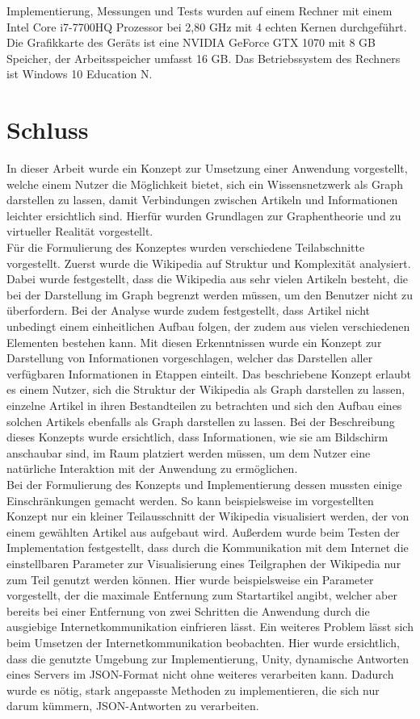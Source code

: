 \documentclass[12pt, a4paper]{article}
\begin{document}
Implementierung, Messungen und Tests wurden auf einem Rechner mit einem Intel Core i7-7700HQ Prozessor bei 2,80 GHz mit 4 echten Kernen durchgeführt. Die Grafikkarte des Geräts ist eine NVIDIA GeForce GTX 1070 mit 8 GB Speicher, der Arbeitsspeicher umfasst 16 GB. Das Betriebssystem des Rechners ist Windows 10 Education N.

\newpage
\section{Schluss}
In dieser Arbeit wurde ein Konzept zur Umsetzung einer Anwendung vorgestellt, welche einem Nutzer die Möglichkeit bietet, sich ein Wissensnetzwerk als Graph darstellen zu lassen, damit Verbindungen zwischen Artikeln und Informationen leichter ersichtlich sind. Hierfür wurden Grundlagen zur Graphentheorie und zu virtueller Realität vorgestellt.\\

Für die Formulierung des Konzeptes wurden verschiedene Teilabschnitte vorgestellt. Zuerst wurde die Wikipedia auf Struktur und Komplexität analysiert. Dabei wurde festgestellt, dass die Wikipedia aus sehr vielen Artikeln besteht, die bei der Darstellung im Graph begrenzt werden müssen, um den Benutzer nicht zu überfordern. Bei der Analyse wurde zudem festgestellt, dass Artikel nicht unbedingt einem einheitlichen Aufbau folgen, der zudem aus vielen verschiedenen Elementen bestehen kann. Mit diesen Erkenntnissen wurde ein Konzept zur Darstellung von Informationen vorgeschlagen, welcher das Darstellen aller verfügbaren Informationen in Etappen einteilt. Das beschriebene Konzept erlaubt es einem Nutzer, sich die Struktur der Wikipedia als Graph darstellen zu lassen, einzelne Artikel in ihren Bestandteilen zu betrachten und sich den Aufbau eines solchen Artikels ebenfalls als Graph darstellen zu lassen. Bei der Beschreibung dieses Konzepts wurde ersichtlich, dass Informationen, wie sie am Bildschirm anschaubar sind, im Raum platziert werden müssen, um dem Nutzer eine natürliche Interaktion mit der Anwendung zu ermöglichen.\\

Bei der Formulierung des Konzepts und Implementierung dessen mussten einige Einschränkungen gemacht werden. So kann beispielsweise im vorgestellten Konzept nur ein kleiner Teilausschnitt der Wikipedia visualisiert werden, der von einem gewählten Artikel aus aufgebaut wird. Außerdem wurde beim Testen der Implementation festgestellt, dass durch die Kommunikation mit dem Internet die einstellbaren Parameter zur Visualisierung eines Teilgraphen der Wikipedia nur zum Teil genutzt werden können. Hier wurde beispielsweise ein Parameter vorgestellt, der die maximale Entfernung zum Startartikel angibt, welcher aber bereits bei einer Entfernung von zwei Schritten die Anwendung durch die ausgiebige Internetkommunikation einfrieren lässt. Ein weiteres Problem lässt sich beim Umsetzen der Internetkommunikation beobachten. Hier wurde ersichtlich, dass die genutzte Umgebung zur Implementierung, Unity, dynamische Antworten eines Servers im JSON-Format nicht ohne weiteres verarbeiten kann. Dadurch wurde es nötig, stark angepasste Methoden zu implementieren, die sich nur darum kümmern, JSON-Antworten zu verarbeiten.\\
\end{document}
